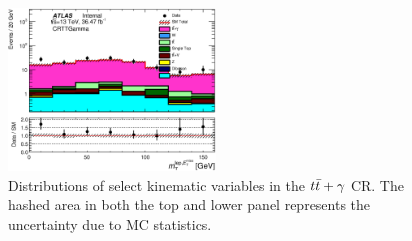\begin{figure}[htbp]
\begin{center}
\includegraphics[width=0.49\textwidth]{figures/ttGamma/MtMetLep_CRTTGamma_withRatio_log.eps}
\caption{\label{fig:ttgamma} Distributions of select kinematic variables in the $t\bar{t}+\gamma$ CR. The hashed area in both the top and lower panel represents the uncertainty due to MC statistics.}
\label{fig:ttgamma}
\end{center}
\end{figure}





